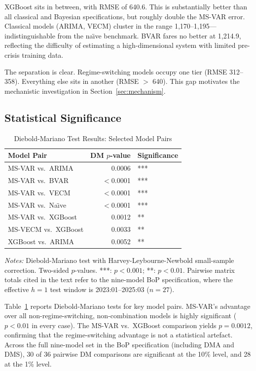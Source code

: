 \documentclass[12pt,a4paper]{article}
\begin{document}
XGBoost sits in between, with RMSE of 640.6. This is substantially better than all classical and Bayesian specifications, but roughly double the MS-VAR error. Classical models (ARIMA, VECM) cluster in the range 1,170--1,195---indistinguishable from the na\"{\i}ve benchmark. BVAR fares no better at 1,214.9, reflecting the difficulty of estimating a high-dimensional system with limited pre-crisis training data.

The separation is clear. Regime-switching models occupy one tier (RMSE 312--358). Everything else sits in another (RMSE $>$ 640). This gap motivates the mechanistic investigation in Section~\ref{sec:mechanism}.

\subsection{Statistical Significance}
\label{sec:stat_tests}

\begin{table}[htbp]
\centering
\caption{Diebold-Mariano Test Results: Selected Model Pairs}
\label{tab:dm_tests}
\begin{tabular}{lrl}
\toprule
Model Pair & DM $p$-value & Significance \\
\midrule
MS-VAR vs.\ ARIMA & 0.0006 & *** \\
MS-VAR vs.\ BVAR & $<$0.0001 & *** \\
MS-VAR vs.\ VECM & $<$0.0001 & *** \\
MS-VAR vs.\ Na\"{\i}ve & $<$0.0001 & *** \\
MS-VAR vs.\ XGBoost & 0.0012 & ** \\
MS-VECM vs.\ XGBoost & 0.0033 & ** \\
XGBoost vs.\ ARIMA & 0.0052 & ** \\
\bottomrule
\end{tabular}
\begin{tablenotes}
\small
\item \textit{Notes:} Diebold-Mariano test with Harvey-Leybourne-Newbold small-sample correction. Two-sided $p$-values. ***: $p < 0.001$; **: $p < 0.01$. Pairwise matrix totals cited in the text refer to the nine-model BoP specification, where the effective $h=1$ test window is 2023:01--2025:03 ($n=27$).
\end{tablenotes}
\end{table}

Table~\ref{tab:dm_tests} reports Diebold-Mariano tests for key model pairs. MS-VAR's advantage over all non-regime-switching, non-combination models is highly significant ($p < 0.01$ in every case). The MS-VAR vs.\ XGBoost comparison yields $p = 0.0012$, confirming that the regime-switching advantage is not a statistical artefact. Across the full nine-model set in the BoP specification (including DMA and DMS), 30 of 36 pairwise DM comparisons are significant at the 10\% level, and 28 at the 1\% level.
\end{document}
